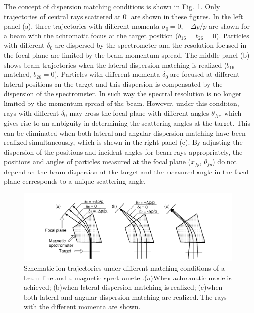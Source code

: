 The concept of dispersion matching conditions is shown in Fig.~\ref{fig:dispersion}. Only trajectories of central rays scattered at 0$^{\circ}$ are shown in these figures. In the left panel (a), three trajectories with different momenta $\sigma_0=0$, $\pm\Delta p/p$ are shown for a beam with the achromatic focus at the target position ($b_{16}=b_{26}=0$). Particles with different $\delta_0$ are dispersed by the spectrometer and the resolution focused in the focal plane are limited by the beam momentum spread.
The middle panel (b) shows beam trajectories when the lateral dispersion-matching is realized ($b_{16}$ matched, $b_{26}=0$).
Particles with different momenta $\delta_0$ are focused at different lateral positions on the target and this dispersion is compensated by the dispersion of the spectrometer. In such way the spectral resolution is no longer limited by the momentum spread of the beam.
However, under this condition, rays with different $\delta_0$ may cross the focal plane with different angles $\theta_{fp}$, which gives rise to an ambiguity in determining the scattering angles at the target. This can be eliminated when both lateral and angular dispersion-matching have been realized simultaneously, which is shown in the right panel (c). By adjusting the dispersion of the positions and incident angles for beam rays appropriately, the positions and angles of particles measured at the focal plane ($x_{fp}$, $\theta_{fp}$) do not depend on the beam dispersion at the target and the measured angle in the focal plane corresponds to a unique scattering angle.




\begin{figure}[tpb]
  \begin{center}
    \centerline{\includegraphics[scale=0.7]{graph/ch3/dispersion}}
    \caption{Schematic ion trajectories under different matching conditions of a beam line and a magnetic spectrometer.(a)When achromatic mode is achieved; (b)when lateral dispersion matching is realized; (c)when both lateral and angular dispersion matching are realized. The rays with the different momenta are shown.~\citep{FUJITA200217}}
    \label{fig:dispersion}
  \end{center}
\end{figure}


